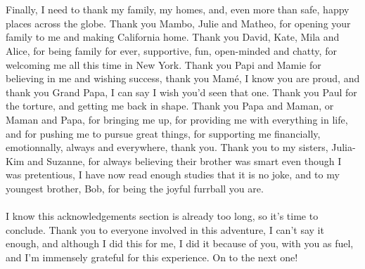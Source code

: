 \\\\
Finally, I need to thank my family, my homes, and, even more than safe, happy places across the globe. Thank you Mambo, Julie and Matheo, for opening your family to me and making California home. Thank you David, Kate, Mila and Alice, for being family for ever, supportive, fun, open-minded and chatty, for welcoming me all this time in New York. Thank you Papi and Mamie for believing in me and wishing success, thank you Mamé, I know you are proud, and thank you Grand Papa, I can say I wish you'd seen that one. Thank you Paul for the torture, and getting me back in shape. Thank you Papa and Maman, or Maman and Papa, for bringing me up, for providing me with everything in life, and for pushing me to pursue great things, for supporting me financially, emotionnally, always and everywhere, thank you. Thank you to my sisters, Julia-Kim and Suzanne, for always believing their brother was smart even though I was pretentious, I have now read enough studies that it is no joke, and to my youngest brother, Bob, for being the joyful furrball you are. 
\\\\
I know this acknowledgements section is already too long, so it's time to conclude. Thank you to everyone involved in this adventure, I can't say it enough, and although I did this for me, I did it because of you, with you as fuel, and I'm immensely grateful for this experience. On to the next one!

